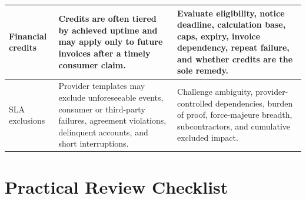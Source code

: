 \documentclass[11pt]{article}
\begin{document}
\begin{longtable}{@{}>{\RaggedRight\arraybackslash}p{}>{\RaggedRight\arraybackslash}p{}>{\RaggedRight\arraybackslash}p{}@{}}
Financial credits & Credits are often tiered by achieved uptime and may apply only to future invoices after a timely consumer claim. & Evaluate eligibility, notice deadline, calculation base, caps, expiry, invoice dependency, repeat failure, and whether credits are the sole remedy. \\\midrule
SLA exclusions & Provider templates may exclude unforeseeable events, consumer or third-party failures, agreement violations, delinquent accounts, and short interruptions. & Challenge ambiguity, provider-controlled dependencies, burden of proof, force-majeure breadth, subcontractors, and cumulative excluded impact. \\\midrule
\bottomrule
\end{longtable}
\endgroup
\section{Practical Review Checklist}
\end{document}
